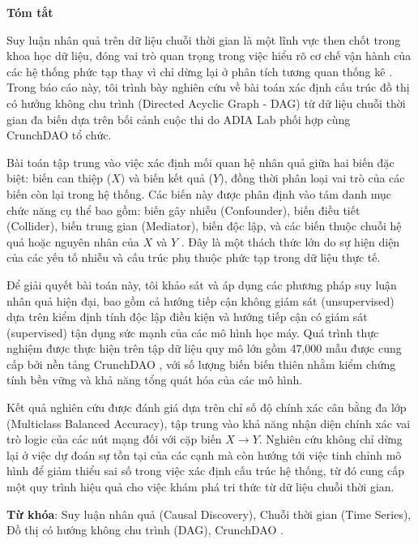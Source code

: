 \begin{center}
\textbf{\large{Tóm tắt}	}
\end{center}


\begin{small}

Suy luận nhân quả trên dữ liệu chuỗi thời gian là một lĩnh vực then chốt trong khoa học dữ liệu, đóng vai trò quan trọng trong việc hiểu rõ cơ chế vận hành của các hệ thống phức tạp thay vì chỉ dừng lại ở phân tích tương quan thống kê \cite{crunchdao_causal_2024}. Trong báo cáo này, tôi trình bày nghiên cứu về bài toán xác định cấu trúc đồ thị có hướng không chu trình (Directed Acyclic Graph - DAG) từ dữ liệu chuỗi thời gian đa biến dựa trên bối cảnh cuộc thi do ADIA Lab phối hợp cùng CrunchDAO tổ chức.

Bài toán tập trung vào việc xác định mối quan hệ nhân quả giữa hai biến đặc biệt: biến can thiệp ($X$) và biến kết quả ($Y$), đồng thời phân loại vai trò của các biến còn lại trong hệ thống. Các biến này được phân định vào tám danh mục chức năng cụ thể bao gồm: biến gây nhiễu (Confounder), biến điều tiết (Collider), biến trung gian (Mediator), biến độc lập, và các biến thuộc chuỗi hệ quả hoặc nguyên nhân của $X$ và $Y$ \cite{crunchdao_causal_2024}. Đây là một thách thức lớn do sự hiện diện của các yếu tố nhiễu và cấu trúc phụ thuộc phức tạp trong dữ liệu thực tế.

Để giải quyết bài toán này, tôi khảo sát và áp dụng các phương pháp suy luận nhân quả hiện đại, bao gồm cả hướng tiếp cận không giám sát (unsupervised) dựa trên kiểm định tính độc lập điều kiện và hướng tiếp cận có giám sát (supervised) tận dụng sức mạnh của các mô hình học máy. Quá trình thực nghiệm được thực hiện trên tập dữ liệu quy mô lớn gồm 47,000 mẫu được cung cấp bởi nền tảng CrunchDAO \cite{crunchdao_causal_2024}, với số lượng biến biến thiên nhằm kiểm chứng tính bền vững và khả năng tổng quát hóa của các mô hình.

Kết quả nghiên cứu được đánh giá dựa trên chỉ số độ chính xác cân bằng đa lớp (Multiclass Balanced Accuracy), tập trung vào khả năng nhận diện chính xác vai trò logic của các nút mạng đối với cặp biến $X \rightarrow Y$. Nghiên cứu không chỉ dừng lại ở việc dự đoán sự tồn tại của các cạnh mà còn hướng tới việc tinh chỉnh mô hình để giảm thiểu sai số trong việc xác định cấu trúc hệ thống, từ đó cung cấp một quy trình hiệu quả cho việc khám phá tri thức từ dữ liệu chuỗi thời gian.

\vspace*{1cm}
\textbf{Từ khóa}: Suy luận nhân quả (Causal Discovery), Chuỗi thời gian (Time Series), Đồ thị có hướng không chu trình (DAG), CrunchDAO \cite{crunchdao_causal_2024}.

\end{small}